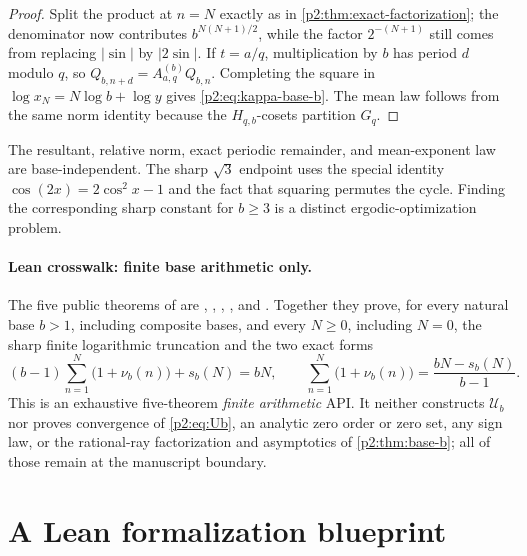 \documentclass[11pt,oneside]{article}
\theoremstyle{definition}
\theoremstyle{remark}
\begin{document}
\begin{proof}
Split the product at $n=N$ exactly as in \cref{p2:thm:exact-factorization}; the
denominator now contributes $b^{N(N+1)/2}$, while the factor $2^{-(N+1)}$ still
comes from replacing $|\sin|$ by $|2\sin|$. If $t=a/q$, multiplication by $b$ has
period $d$ modulo $q$, so $Q_{b,n+d}=A_{a,q}^{(b)}Q_{b,n}$. Completing the square
in $\log x_N=N\log b+\log y$ gives \eqref{p2:eq:kappa-base-b}. The mean law follows
from the same norm identity because the $H_{q,b}$-cosets partition $G_q$.
\end{proof}

\begin{remark}
The resultant, relative norm, exact periodic remainder, and mean-exponent law are
base-independent. The sharp $\sqrt3$ endpoint uses the special identity
$\cos(2x)=2\cos^2x-1$ and the fact that squaring permutes the cycle. Finding the
corresponding sharp constant for $b\ge3$ is a distinct ergodic-optimization problem.
\end{remark}

\paragraph{Lean crosswalk: finite base arithmetic only.}
The five public theorems of  are
,
,
,
, and
.  Together they prove,
for every natural base \(b>1\), including composite bases, and every
\(N\ge0\), including \(N=0\), the sharp finite logarithmic truncation and
the two exact forms
\[
 (b-1)\sum_{n=1}^{N}\bigl(1+\nu_b(n)\bigr)+s_b(N)=bN,
 \qquad
 \sum_{n=1}^{N}\bigl(1+\nu_b(n)\bigr)
   =\frac{bN-s_b(N)}{b-1}.
\]
This is an exhaustive five-theorem \emph{finite arithmetic} API.  It neither
constructs \(\mathscr U_b\) nor proves convergence of \eqref{p2:eq:Ub}, an
analytic zero order or zero set, any sign law, or the rational-ray
factorization and asymptotics of \cref{p2:thm:base-b}; all of those remain at
the manuscript boundary.

\section{A Lean formalization blueprint}\label{p2:sec:lean-blueprint}
\end{document}
